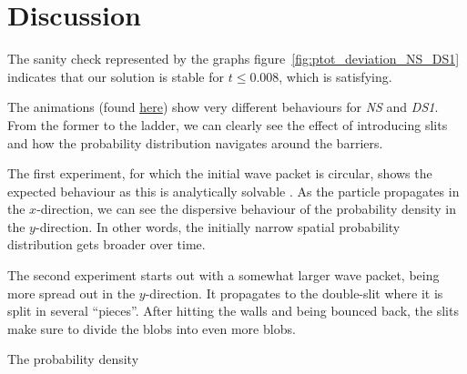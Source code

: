 \section{Discussion}\label{sec:discussion}



The sanity check represented by the graphs figure~\ref{fig:ptot_deviation_NS_DS1} indicates that our solution is stable for $t\leq 0.008$, which is satisfying. 


The animations (found \href{\animlink}{here}) show very different behaviours for \textit{NS} and \textit{DS1}. From the former to the ladder, we can clearly see the effect of introducing slits and how the probability distribution navigates around the barriers. 

The first experiment, for which the initial wave packet is circular, shows the expected behaviour as this is analytically solvable . As the particle propagates in the $x$-direction, we can see the dispersive behaviour of the probability density in the $y$-direction. In other words, the initially narrow spatial probability distribution gets broader over time.


The second experiment starts out with a somewhat larger wave packet, being more spread out in the $y$-direction. It propagates to the double-slit where it is split in several ``pieces''. After hitting the walls and being bounced back, the slits make sure to divide the blobs into even more blobs. 






The probability density 









